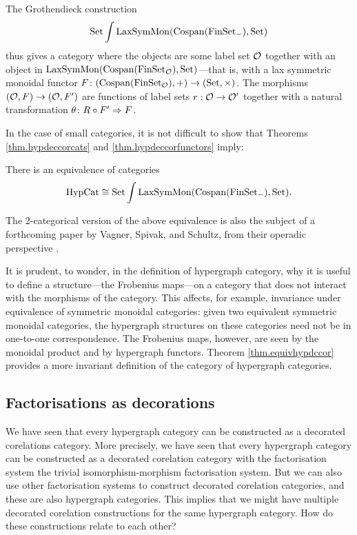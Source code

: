 The Grothendieck construction 
\[
 \mathrm{Set}\int \mathrm{LaxSymMon}(\operatorname{{Cospan}}(\mathrm{FinSet}_{-}), \mathrm{Set})
\]
thus gives a category where the objects are some label set $\mathcal O$ together with
an object in $\mathrm{LaxSymMon}(\operatorname{{Cospan}}(\mathrm{FinSet}_{\mathcal O}), \mathrm{Set})$---that is,
with a lax symmetric monoidal functor $F{\colon} (\operatorname{{Cospan}}(\mathrm{FinSet}_{\mathcal O}),+) \to
(\mathrm{Set},\times)$. The morphisms $(\mathcal O, F) \to (\mathcal O,F')$ are functions of label
sets $r: \mathcal O \to \mathcal O'$ together with a natural transformation $\theta{\colon}
R \circ F'\Rightarrow F$.

In the case of small categories, it is not difficult to show that Theorems
\ref{thm.hypdeccorcats} and \ref{thm.hypdeccorfunctors} imply:

\begin{theorem} \label{thm.equivhypdccor}
  There is an equivalence of categories
\[
  \mathrm{HypCat} \cong \mathrm{Set}\int \mathrm{LaxSymMon}(\operatorname{{Cospan}}(\mathrm{FinSet}_{-}), \mathrm{Set}).
\]
\end{theorem}

The 2-categorical version of the above equivalence is also the subject of a
forthcoming paper by Vagner, Spivak, and Schultz, from their operadic
perspective \cite{VSS}.

\begin{remark}
  It is prudent, to wonder, in the definition of hypergraph category, why it is
  useful to define a structure---the Frobenius maps---on a category that does
  not interact with the morphisms of the category. This affects, for example,
  invariance under equivalence of symmetric monoidal categories: given two
  equivalent symmetric monoidal categories, the hypergraph structures on these
  categories need not be in one-to-one correspondence. The Frobenius maps,
  however, are seen by the monoidal product and by hypergraph functors. Theorem
  \ref{thm.equivhypdccor} provides a more invariant definition of the category
  of hypergraph categories.
\end{remark}

\subsection{Factorisations as decorations}

We have seen that every hypergraph category can be constructed as a decorated
corelations category. More precisely, we have seen that every hypergraph
category can be constructed as a decorated corelation category with the
factorisation system the trivial isomorphism-morphism factorisation system. But
we can also use other factorisation systems to construct decorated corelation
categories, and these are also hypergraph categories. This implies that we might
have multiple decorated corelation constructions for the same hypergraph
category.  How do these constructions relate to each other?


